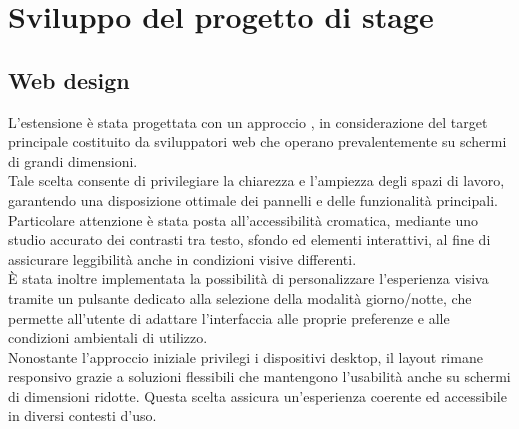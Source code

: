 \chapter{Sviluppo del progetto di stage}
\label{chap:sviluppo}

\section{Web design}
\noindent L’estensione è stata progettata con un approccio , in considerazione del target principale costituito da sviluppatori web che operano prevalentemente su schermi di grandi dimensioni. \\Tale scelta consente di privilegiare la chiarezza e l’ampiezza degli spazi di lavoro, garantendo una disposizione ottimale dei pannelli e delle funzionalità principali.\\
Particolare attenzione è stata posta all’accessibilità cromatica, mediante uno studio accurato dei contrasti tra testo, sfondo ed elementi interattivi, al fine di assicurare leggibilità anche in condizioni visive differenti. \\È stata inoltre implementata la possibilità di personalizzare l’esperienza visiva tramite un pulsante dedicato alla selezione della modalità giorno/notte, che permette all’utente di adattare l’interfaccia alle proprie preferenze e alle condizioni ambientali di utilizzo.\\
Nonostante l’approccio iniziale privilegi i dispositivi desktop, il layout rimane responsivo grazie a soluzioni flessibili che mantengono l’usabilità anche su schermi di dimensioni ridotte. Questa scelta assicura un’esperienza coerente ed accessibile in diversi contesti d’uso.

